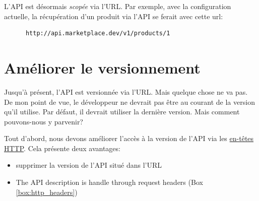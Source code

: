 \documentclass[]{report}
\begin{document}
    L'API est désormais \textit{scopée} via l'URL. Par exemple, avec la configuration actuelle, la récupération d'un produit via l'API se ferait avec cette url:

    \begin{scriptsize}
      \begin{lstlisting}
      http://api.marketplace.dev/v1/products/1
      \end{lstlisting}
    \end{scriptsize}

  \section{Améliorer le versionnement}\label{section:improve_api_versioning}

    Jusqu'à présent, l'API est versionnée via l'URL. Mais quelque chose ne va pas. De mon point de vue, le développeur ne devrait pas être au courant de la version qu'il utilise. Par défaut, il devrait utiliser la dernière version. Mais comment pouvons-nous y parvenir?

    Tout d'abord, nous devons améliorer l'accès à la version de l'API via les \href{http://en.wikipedia.org/wiki/List_of_HTTP_header_fields}{en-têtes HTTP}. Cela présente deux avantages:

    \begin{itemize}
      \item supprimer la version de l'API situé dans l'URL
      \item The API description is handle through request headers (Box \ref{box:http_headers})
    \end{itemize}
\end{document}
